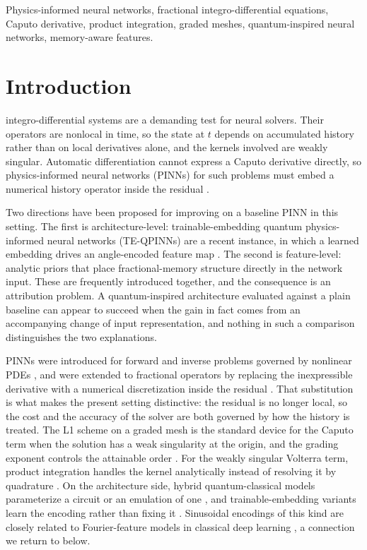 \documentclass[journal]{IEEEtran}
\begin{document}
\begin{IEEEkeywords}
Physics-informed neural networks, fractional integro-differential equations,
Caputo derivative, product integration, graded meshes, quantum-inspired neural
networks, memory-aware features.
\end{IEEEkeywords}

\section{Introduction}
 integro-differential systems are a demanding test
for neural solvers. Their operators are nonlocal in time, so the state at $t$
depends on accumulated history rather than on local derivatives alone, and the
kernels involved are weakly singular. Automatic differentiation cannot express a
Caputo derivative directly, so physics-informed neural networks (PINNs) for such
problems must embed a numerical history operator inside the residual
\cite{PINNs,FracPINN}.

Two directions have been proposed for improving on a baseline PINN in this
setting. The first is architecture-level: trainable-embedding quantum
physics-informed neural networks (TE-QPINNs) are a recent instance, in which a
learned embedding drives an angle-encoded feature map \cite{QNN,TEQPINN}. The
second is feature-level: analytic priors that place fractional-memory structure
directly in the network input. These are frequently introduced together, and the
consequence is an attribution problem. A quantum-inspired architecture evaluated
against a plain baseline can appear to succeed when the gain in fact comes from an
accompanying change of input representation, and nothing in such a comparison
distinguishes the two explanations.

PINNs were introduced for forward and inverse problems governed by nonlinear PDEs
\cite{PINNs}, and were extended to fractional operators by replacing the
inexpressible derivative with a numerical discretization inside the residual
\cite{FracPINN}. That substitution is what makes the present setting distinctive:
the residual is no longer local, so the cost and the accuracy of the solver are
both governed by how the history is treated. The L1 scheme on a graded mesh is the
standard device for the Caputo term when the solution has a weak singularity at
the origin, and the grading exponent controls the attainable order
\cite{L1Scheme,GradedMesh}. For the weakly singular Volterra term, product
integration handles the kernel analytically instead of resolving it by quadrature
\cite{ProductIntegration,VolterraCollocation}. On the architecture side, hybrid
quantum-classical models parameterize a circuit or an emulation of one
\cite{QNN}, and trainable-embedding variants learn the encoding rather than fixing
it \cite{TEQPINN}. Sinusoidal encodings of this kind are closely related to
Fourier-feature models in classical deep learning \cite{FourierFeatures}, a
connection we return to below.
\end{document}
